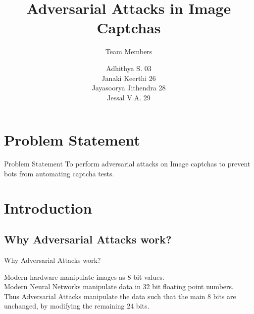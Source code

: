 \documentclass{beamer}
\title{Adversarial Attacks in Image Captchas} %
\subtitle{Team Members} %
\author{Adhithya S. 03\\Janaki Keerthi  26\\Jayasoorya Jithendra  28\\Jessal V.A.  29}
\begin{document}
  \frame{\maketitle}

  \begin{darkframes}
    \section{Problem Statement}
    \begin{frame}{Problem Statement}
      To perform adversarial attacks on Image captchas to prevent bots from automating captcha tests.\\
      
    \end{frame}
    
    \section{Introduction}
    
    \subsection{Why Adversarial Attacks work?}
    \begin{frame}{Why Adversarial Attacks work?}
    
    
        Modern hardware manipulate images as 8 bit values.\\\bigskip
        Modern Neural Networks manipulate data in 32 bit floating point numbers.\\\bigskip
        Thus Adversarial Attacks manipulate the data such that the main 8 bits are unchanged, by modifying the remaining 24 bits.\\\bigskip
        

    \end{frame}


\end{darkframes}
\end{document}
